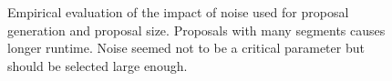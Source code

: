 \documentclass[10pt,twocolumn,letterpaper]{article}
\theoremstyle{definition}
\begin{document}
\begin{figure}[th]
\centering
{}
\caption{Empirical evaluation of the impact of noise used for proposal generation and proposal size.
  Proposals with many segments causes longer runtime. Noise seemed not to be a critical parameter but should be selected large enough.
}
\label{fig:parameterchoice}
\end{figure}
\end{document}
